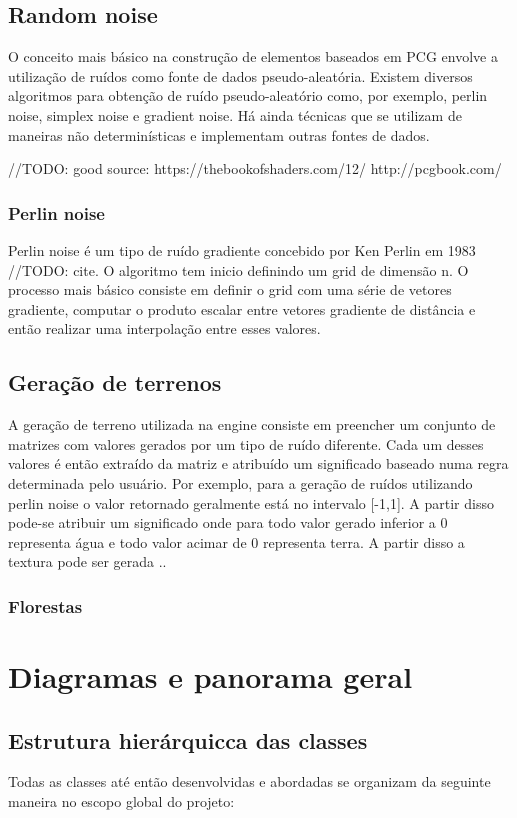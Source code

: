 \documentclass[12pt, 
openright, 
oneside, 
a4paper,    
brazil]{facom-ufu-abntex2}
\begin{document}
\section{Random noise}
O conceito mais básico na construção de elementos baseados em PCG envolve a utilização de ruídos como fonte de dados pseudo-aleatória. Existem diversos algoritmos para obtenção de ruído pseudo-aleatório como, por exemplo, perlin noise, simplex noise e gradient noise. Há ainda técnicas que se utilizam de maneiras não determinísticas e implementam outras fontes de dados.

//TODO: good source: https://thebookofshaders.com/12/ http://pcgbook.com/

\subsection{Perlin noise}
Perlin noise é um tipo de ruído gradiente concebido por Ken Perlin em 1983 //TODO: cite. O algoritmo tem inicio definindo um grid de dimensão n. O processo mais básico consiste em definir o grid com uma série de vetores gradiente, computar o produto escalar entre vetores gradiente de distância e então realizar uma interpolação entre esses valores.

\section{Geração de terrenos}
A geração de terreno utilizada na engine consiste em preencher um conjunto de matrizes com valores gerados por um tipo de ruído diferente. Cada um desses valores é então extraído da matriz e atribuído um significado baseado numa regra determinada pelo usuário. Por exemplo, para a geração de ruídos utilizando perlin noise o valor retornado geralmente está no intervalo [-1,1]. A partir disso pode-se atribuir um significado onde para todo valor gerado inferior a 0 representa água e todo valor acimar de 0 representa terra. A partir disso a textura pode ser gerada ..

\subsection{Florestas}

\chapter{Diagramas e panorama geral}
\section{Estrutura hierárquicca das classes}
Todas as classes até então desenvolvidas e abordadas se organizam da seguinte maneira no escopo global do projeto:
\end{document}
